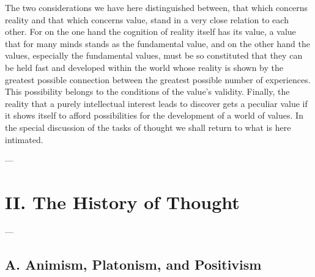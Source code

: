 \documentclass[12pt,a4paper]{book}
\begin{document}
The two considerations we have here distinguished between, that which
concerns reality and that which concerns value, stand in a very close
relation to each other. For on the one hand the cognition of reality
itself has its value, a value that for many minds stands as the
fundamental value, and on the other hand the values, especially the
fundamental values, must be so constituted that they can be held fast and
developed within the world whose reality is shown by the greatest possible
connection between the greatest possible number of experiences. This
possibility belongs to the conditions of the value's validity. Finally,
the reality that a purely intellectual interest leads to discover gets a
peculiar value if it shows itself to afford possibilities for the
development of a world of values. In the special discussion of the tasks of
thought we shall return to what is here intimated.

\begin{center}---\end{center}

\chapter*{II. The History of Thought}
\label{ch:historie}

\begin{center}---\end{center}

\section*{A. Animism, Platonism, and Positivism}
\label{sec:animisme}
\end{document}
